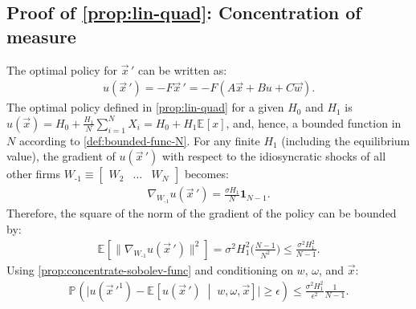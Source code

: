 \documentclass[12pt]{article}
\newcommand{\condexpec}[3][]{\ensuremath{\mathbb{E}_{#1}\left[{#2} \; \middle| \; {#3} \right]}}
\newcommand{\prob}[2][]{\ensuremath{\mathbb{P}_{#1}\left( {#2} \right)}}
\newcommand{\expec}[2][]{\ensuremath{\mathbb{E}_{{#1}}\left[ {#2} \right]}}
\begin{document}
\subsection{Proof of \cref{prop:lin-quad}: Concentration of measure}\label{sec:concentration-LQ} 

The optimal policy for $\vec{x}\,'$ can be written as:
\begin{align*}
u(\vec{x}\,') = -F\vec{x}\,' = - F (A\vec{x}+Bu+C \vec{w}).
\end{align*}
The optimal policy defined in \cref{prop:lin-quad}  for a given $H_0$ and $H_1$ is $
u(\vec{x})  = H_0 +\frac{H_1}{N} \sum_{i=1}^N X_i =  H_0 + H_1 \expec{x}$, and, hence, a bounded function in $N$ according to \cref{def:bounded-func-N}. For any finite $H_1$ (including the equilibrium value), the gradient of $u(\vec{x}\,')$ with respect to the idiosyncratic shocks of all other firms $W_{\text{-}1} \equiv \begin{bmatrix}W_2 & \ldots & W_N\end{bmatrix}$ becomes:
\begin{align*}
\nabla_{{W_{\text{-}1}}} u(\vec{x}\,') = \frac{\sigma H_1}{N}\mathbf{1}_{N-1}.
\end{align*}
Therefore, the square of the norm of the gradient of the policy can be bounded by:
\begin{align*}
\expec{\|\nabla_{{W_{\text{-}1}}}u(\vec{x}\,')\|^2} =  \sigma^2 H_1^2 \big(\frac{N-1}{N^2}\big) \leq \frac{\sigma^2 H_1^2}{N-1}.
\end{align*}
Using \cref{prop:concentrate-sobolev-func} and conditioning on $w$, $\omega$, and $\vec{x}$:
\begin{align}
\label{inequ:concentration-measure-lin-policy-app}
\prob{\big|u(\vec{x}\,'^1)-\condexpec{u(\vec{x}\,')}{w,\omega,\vec{x}}\big|\geq \epsilon} \leq \frac{\sigma^2 H_1^2}{\epsilon^2} \frac{1}{N-1}.	
\end{align}
\end{document}
